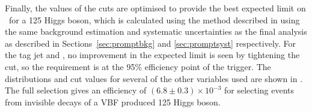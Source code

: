 Finally, the values of the cuts are optimised to provide the best expected limit on \BRinv\, for a 125 \GeV Higgs boson, which is calculated using the method described in  using the same background estimation and systematic uncertainties as the final analysis as described in Sections~\ref{sec:promptbkg} and \ref{sec:promptsyst} respectively. For the tag jet \pt and \METnoMU, no improvement in the expected limit is seen by tightening the cut, so the requirement is at the 95\% efficiency point of the trigger. The distributions and cut values for several of the other variables used are shown in . The full selection gives an efficiency of $(6.8\pm 0.3)\times 10^{-3}$ for selecting events from invisible decays of a VBF produced 125 \GeV Higgs boson.  

